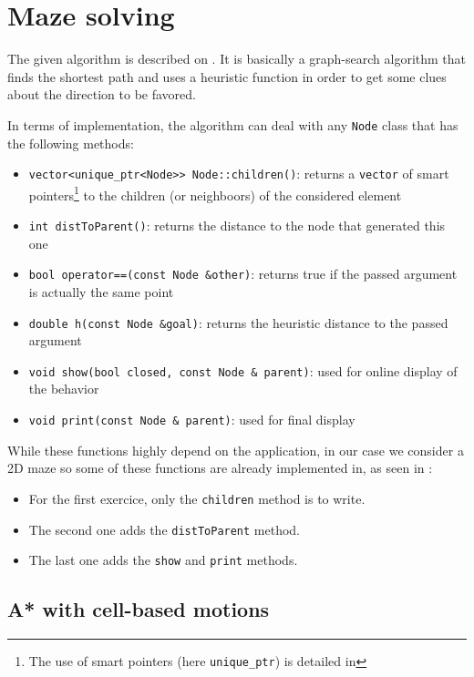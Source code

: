 \documentclass{ecnreport}
\begin{document}
\section{Maze solving}

The given algorithm is described on . It is basically a graph-search algorithm that
finds the shortest path and uses a heuristic function in order to get some clues about the direction to be favored.

In terms of implementation, the algorithm can deal with any \texttt{Node} class that has the following methods:
\begin{itemize}
 \item \texttt{vector<unique\_ptr<Node>> Node::children()}: returns a \texttt{vector} of smart pointers\footnote{The use of smart pointers (here \texttt{unique\_ptr}) is detailed in } to the children (or neighboors) of the considered
 element
 \item \texttt{int distToParent()}: returns the distance to the node that generated this one
 \item \texttt{bool operator==(const Node \&other)}: returns true if the passed argument is actually the same point
 \item \texttt{double h(const Node \&goal)}: returns the heuristic distance to the passed argument
 \item \texttt{void show(bool closed, const Node \& parent)}: used for online display of the behavior
 \item \texttt{void print(const Node \& parent)}: used for final display
\end{itemize}


While these functions highly depend on the application, in our case we consider a 2D maze so some of these functions are already implemented in, as seen in :
\begin{itemize}
 \item For the first exercice, only the \texttt{children} method is to write.
 \item The second one adds the \texttt{distToParent} method.
 \item The last one adds the \texttt{show} and \texttt{print} methods.
\end{itemize}



\subsection{A* with cell-based motions}
\end{document}
